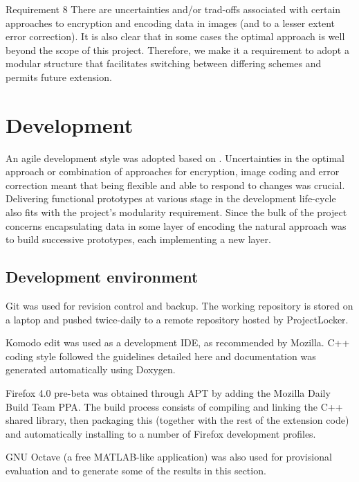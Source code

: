 \begin{desc}
    \item[Requirement 8] There are uncertainties and/or trad-offs associated with certain approaches to encryption and encoding data in images (and to a lesser extent error correction). It is also clear that in some cases the optimal approach is well beyond the scope of this project. Therefore, we make it a requirement to adopt a modular structure that facilitates switching between differing schemes and permits future extension.
    
\end{desc}


   
\FloatBarrier 
\section{Development}
        
An agile development style was adopted based on \cite{XXX}. Uncertainties in the optimal approach or combination of approaches for encryption, image coding and error correction meant that being flexible and able to respond to changes was crucial. Delivering functional prototypes at various stage in the development life-cycle also fits with the project's modularity requirement. Since the bulk of the project concerns encapsulating data in some layer of encoding the natural approach was to build successive prototypes, each implementing a new layer.

\subsection{Development environment}

Git was used for revision control and backup. The working repository is stored on a laptop and pushed twice-daily to a remote repository hosted by ProjectLocker.

Komodo edit was used as a development IDE, as recommended by Mozilla. C++ coding style followed the guidelines detailed here \cite{code-style} and documentation was generated automatically using Doxygen.

Firefox 4.0 pre-beta was obtained through APT by adding the Mozilla Daily Build Team PPA. The build process consists of compiling and linking the C++ shared library, then packaging this (together with the rest of the extension code) and automatically installing to a number of Firefox development profiles.        

GNU Octave (a free MATLAB-like application) was also used for provisional evaluation and to generate some of the results in this section.



